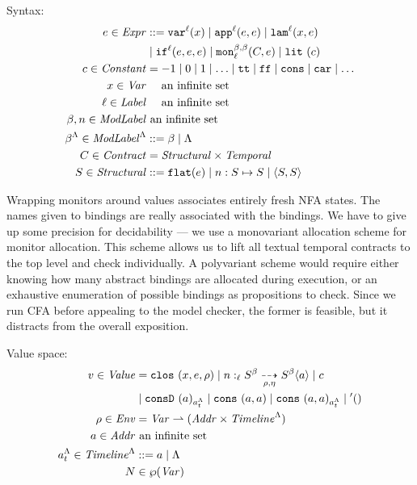\documentclass[preprint,onecolumn,9pt]{sigplanconf} %
\begin{document}
Syntax:
\begin{align*}
\mexp \in \Expr &::=
      \svar[^\mlab]{\mvar}
 \alt \sapp[^\mlab]{\mexp}{\mexp}
 \alt \slam[^\mlab]{\mvar}{\mexp} \\
&\alt \sif[^\mlab]{\mexp}{\mexp}{\mexp} 
 \alt \sMon{\mmlab}{\mmlab}{\mlab}{\mcontract, \mexp}
 \alt \slit{\mconstant} \\
\mconstant \in \Constant &= -1 \alt 0 \alt 1 \alt \ldots \alt \strue \alt \sfalse \alt \scons \alt \scar \alt \ldots \\
\mvar \in \Var &\quad\text{ an infinite set} \\
\mlab \in \Label &\quad\text{ an infinite set} \\
\mmlab,\mname \in \ModuleLabel &\text{ an infinite set} \\
\msmlab \in \ModuleLabel^{\toplevel} &::= \mmlab \alt \toplevel \\
\mcontract \in \Contract &= \SContract \times \TContract \\
\mscon \in \SContract &::= \sflat{\mexp} \alt \sarr{\mname}{\mscon}{\mscon} \alt \sconsc{\mscon}{\mscon} \\
\end{align*}

Wrapping monitors around values associates entirely fresh NFA states.
%
The names given to bindings are really associated with the bindings.
%
We have to give up some precision for decidability --- we use a monovariant allocation scheme for monitor allocation.
%
This scheme allows us to lift all textual temporal contracts to the top level and check individually.
%
A polyvariant scheme would require either knowing how many abstract bindings are allocated during execution, or an exhaustive enumeration of possible bindings as propositions to check.
%
Since we run CFA before appealing to the model checker, the former is feasible, but it distracts from the overall exposition.

Value space:
\begin{align*}
  \mval \in \Value &=
    \clos{\mvar, \mexp, \menv}
   \alt \blclos{\mname}{\mmlab}{\mmlab}{\mlab}{\mscon}{\mscon}{\menv}{\mtimeline}{\maddr}
   \alt \mconstant \\
&  \alt \vconsf{\maddr}{\mstimeline}
   \alt \vcons{\maddr}{\maddr}
   \alt \vconst{\maddr}{\maddr}{\mstimeline}
   \alt \sunit \\
  \menv \in \Env &= \Var \parto (\Addr \times \Timeline^{\toplevel}) \\
  \maddr \in \Addr &\text{ an infinite set} \\
  \mstimeline \in \Timeline^{\toplevel} &::= \maddr \alt \toplevel \\
  \mnames &\in \wp(\Var) \\
\end{align*}
\end{document}
